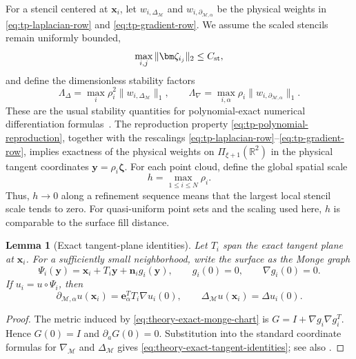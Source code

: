 \documentclass[a4paper,fleqn]{cas-sc}
\newtheorem{lemma}[theorem]{Lemma}
\begin{document}
For a stencil centered at \(\bm x_i\), let
 \(w_{i,\Delta_{\mathcal M}}\) and
\(w_{i,\partial_{\mathcal M,\alpha}}\) be the physical weights in
\eqref{eq:tp-laplacian-row} and \eqref{eq:tp-gradient-row}.  We assume the
scaled stencils remain uniformly bounded,
\begin{equation}
  \max_{i,j}\|\bm\zeta_{i_j}\|_2\leq C_{\rm st},
  \label{eq:theory-scaled-stencil-bound}
\end{equation}
and define the dimensionless stability factors
\begin{equation}
  \Lambda_\Delta
  =\max_i
    \rho_i^2\|w_{i,\Delta_{\mathcal M}}\|_1,
  \qquad
  \Lambda_\nabla
  =\max_{i,\alpha}
    \rho_i\|w_{i,\partial_{\mathcal M,\alpha}}\|_1.
  \label{eq:theory-stability-factors}
\end{equation}
These are the usual stability quantities for polynomial-exact numerical
differentiation formulas~\cite{DavydovSchaback2018}.  The reproduction
property \eqref{eq:tp-polynomial-reproduction}, together with the rescalings
\eqref{eq:tp-laplacian-row}--\eqref{eq:tp-gradient-row}, implies exactness of
the physical weights on \(\Pi_{\xi+1}(\mathbb R^2)\) in the physical tangent
coordinates \(\bm y=\rho_i\bm\zeta\).  For each point cloud, define the global spatial scale
\[
  h=\max_{1\leq i\leq N}\rho_i.
\]
Thus, \(h\to0\) along a refinement sequence means that the largest local
stencil scale tends to zero.  For quasi-uniform point sets and the scaling used
here, \(h\) is comparable to the surface fill distance.

\begin{lemma}[Exact tangent-plane identities]
\label{lem:exact-tangent-plane-identities}
Let \(T_i\) span the exact tangent plane at \(\bm x_i\).  For a sufficiently
small neighborhood, write the surface as the Monge graph
\begin{equation}
  \Psi_i(\bm y)
  =\bm x_i+T_i\bm y+\bm n_i g_i(\bm y),
  \qquad g_i(0)=0,\qquad \nabla g_i(0)=0.
  \label{eq:theory-exact-monge-chart}
\end{equation}
If \(u_i=u\circ\Psi_i\), then
\begin{equation}
  \partial_{\mathcal M,\alpha}u(\bm x_i)
  =\bm e_\alpha^TT_i\nabla u_i(0),
  \qquad
  \Delta_{\mathcal M}u(\bm x_i)=\Delta u_i(0).
  \label{eq:theory-exact-tangent-identities}
\end{equation}
\end{lemma}

\begin{proof}
The metric induced by \eqref{eq:theory-exact-monge-chart} is
\(G=I+\nabla g_i\nabla g_i^T\).  Hence \(G(0)=I\) and
\(\partial_aG(0)=0\).  Substitution into the standard coordinate formulas for
\(\nabla_{\mathcal M}\) and \(\Delta_{\mathcal M}\) gives
\eqref{eq:theory-exact-tangent-identities}; see also
\cite{JonesBoslerKuberryWright2023}.
\end{proof}
\end{document}
